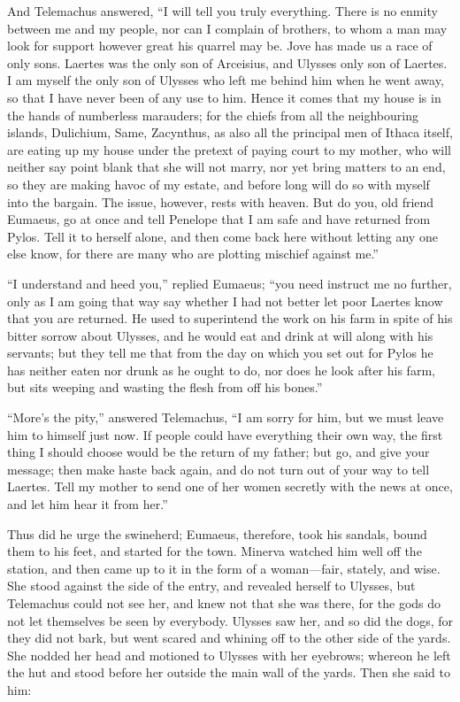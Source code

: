And Telemachus answered, “I will tell you truly everything. There is no enmity
between me and my people, nor can I complain of brothers, to whom a man may
look for support however great his quarrel may be. Jove has made us a race of
only sons. Laertes was the only son of Arceisius, and Ulysses only son of
Laertes. I am myself the only son of Ulysses who left me behind him when he
went away, so that I have never been of any use to him. Hence it comes that my
house is in the hands of numberless marauders; for the chiefs from all the
neighbouring islands, Dulichium, Same, Zacynthus, as also all the principal men
of Ithaca itself, are eating up my house under the pretext of paying court to
my mother, who will neither say point blank that she will not marry, nor yet
bring matters to an end, so they are making havoc of my estate, and before long
will do so with myself into the bargain. The issue, however, rests with heaven.
But do you, old friend Eumaeus, go at once and tell Penelope that I am safe and
have returned from Pylos. Tell it to herself alone, and then come back here
without letting any one else know, for there are many who are plotting mischief
against me.”

“I understand and heed you,” replied Eumaeus; “you need instruct me no further,
only as I am going that way say whether I had not better let poor Laertes know
that you are returned. He used to superintend the work on his farm in spite of
his bitter sorrow about Ulysses, and he would eat and drink at will along with
his servants; but they tell me that from the day on which you set out for Pylos
he has neither eaten nor drunk as he ought to do, nor does he look after his
farm, but sits weeping and wasting the flesh from off his bones.”

“More’s the pity,” answered Telemachus, “I am sorry for him, but we must leave
him to himself just now. If people could have everything their own way, the
first thing I should choose would be the return of my father; but go, and give
your message; then make haste back again, and do not turn out of your way to
tell Laertes. Tell my mother to send one of her women secretly with the news at
once, and let him hear it from her.”

Thus did he urge the swineherd; Eumaeus, therefore, took his sandals, bound
them to his feet, and started for the town. Minerva watched him well off the
station, and then came up to it in the form of a woman—fair, stately, and wise.
She stood against the side of the entry, and revealed herself to Ulysses, but
Telemachus could not see her, and knew not that she was there, for the gods do
not let themselves be seen by everybody. Ulysses saw her, and so did the dogs,
for they did not bark, but went scared and whining off to the other side of the
yards. She nodded her head and motioned to Ulysses with her eyebrows; whereon
he left the hut and stood before her outside the main wall of the yards. Then
she said to him:

